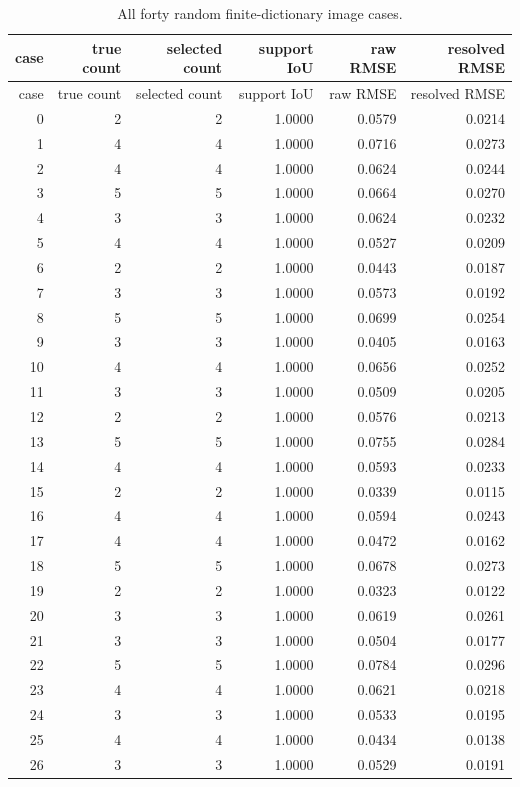 {\scriptsize\setlength{\tabcolsep}{3pt}
\begin{longtable}{rrrrrr}
\caption{All forty random finite-dictionary image cases.}\label{tab:random-full}\\
\toprule
case & true count & selected count & support IoU & raw RMSE & resolved RMSE\\
\midrule\endfirsthead
\toprule case & true count & selected count & support IoU & raw RMSE & resolved RMSE\\\midrule\endhead
0 & 2 & 2 & 1.0000 & 0.0579 & 0.0214\\
1 & 4 & 4 & 1.0000 & 0.0716 & 0.0273\\
2 & 4 & 4 & 1.0000 & 0.0624 & 0.0244\\
3 & 5 & 5 & 1.0000 & 0.0664 & 0.0270\\
4 & 3 & 3 & 1.0000 & 0.0624 & 0.0232\\
5 & 4 & 4 & 1.0000 & 0.0527 & 0.0209\\
6 & 2 & 2 & 1.0000 & 0.0443 & 0.0187\\
7 & 3 & 3 & 1.0000 & 0.0573 & 0.0192\\
8 & 5 & 5 & 1.0000 & 0.0699 & 0.0254\\
9 & 3 & 3 & 1.0000 & 0.0405 & 0.0163\\
10 & 4 & 4 & 1.0000 & 0.0656 & 0.0252\\
11 & 3 & 3 & 1.0000 & 0.0509 & 0.0205\\
12 & 2 & 2 & 1.0000 & 0.0576 & 0.0213\\
13 & 5 & 5 & 1.0000 & 0.0755 & 0.0284\\
14 & 4 & 4 & 1.0000 & 0.0593 & 0.0233\\
15 & 2 & 2 & 1.0000 & 0.0339 & 0.0115\\
16 & 4 & 4 & 1.0000 & 0.0594 & 0.0243\\
17 & 4 & 4 & 1.0000 & 0.0472 & 0.0162\\
18 & 5 & 5 & 1.0000 & 0.0678 & 0.0273\\
19 & 2 & 2 & 1.0000 & 0.0323 & 0.0122\\
20 & 3 & 3 & 1.0000 & 0.0619 & 0.0261\\
21 & 3 & 3 & 1.0000 & 0.0504 & 0.0177\\
22 & 5 & 5 & 1.0000 & 0.0784 & 0.0296\\
23 & 4 & 4 & 1.0000 & 0.0621 & 0.0218\\
24 & 3 & 3 & 1.0000 & 0.0533 & 0.0195\\
25 & 4 & 4 & 1.0000 & 0.0434 & 0.0138\\
26 & 3 & 3 & 1.0000 & 0.0529 & 0.0191\\

\end{longtable}}
